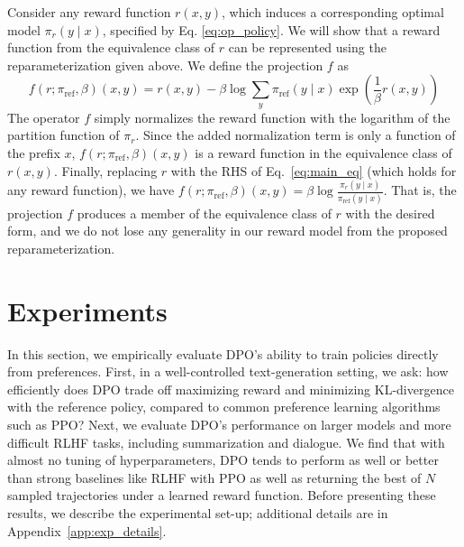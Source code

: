 \begin{sproof}
    Consider any reward function $r(x, y)$, which induces a corresponding optimal model $\pi_r(y \mid x)$, specified by Eq. \ref{eq:op_policy}. We will show that a reward function from the equivalence class of $r$ can be represented using the reparameterization given above. We define the projection $f$ as  
\begin{equation}
    f(r; \pi_\text{ref}, \beta)(x, y) = r(x, y) - \beta\log\sum_{y}\pi_\text{ref}(y\mid x)\exp\left(\frac{1}{\beta}r(x, y)\right)
\end{equation}
The operator $f$ simply normalizes the reward function with the logarithm of the partition function of $\pi_r$. Since the added normalization term is only a function of the prefix $x$, $f(r; \pi_\text{ref}, \beta)(x, y) $ is a reward function in the equivalence class of $r(x, y)$. Finally, replacing $r$ with the RHS of Eq.~\ref{eq:main_eq} (which holds for any reward function), we have $f(r; \pi_\text{ref}, \beta)(x, y) = \beta \log \frac{\pi_r(y\mid x)}{\pi_\text{ref}(y\mid x)}$. That is, the projection $f$ produces a member of the equivalence class of $r$ with the desired form, and we do not lose any generality in our reward model from the proposed reparameterization.
\end{sproof}

\section{Experiments}
In this section, we empirically evaluate DPO's ability to train policies directly from preferences. First, in a well-controlled text-generation setting, we ask: how efficiently does DPO trade off maximizing reward and minimizing KL-divergence with the reference policy, compared to common preference learning algorithms such as PPO? Next, we evaluate DPO's performance on larger models and more difficult RLHF tasks, including summarization and dialogue. We find that with almost no tuning of hyperparameters, DPO tends to perform as well or better than strong baselines like RLHF with PPO as well as returning the best of $N$ sampled trajectories under a learned reward function. Before presenting these results, we describe the experimental set-up; additional details are in Appendix~\ref{app:exp_details}.

